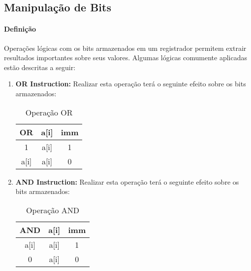 \documentclass{article}
\begin{document}
        \subsection{Manipulação de Bits}
            \paragraph{Definição}Operações lógicas com os bits armazenados em um registrador permitem extrair resultados importantes sobre seus valores. Algumas lógicas comumente aplicadas estão descritas a seguir:
                \begin{enumerate}[rightmargin = \leftmargin]
                    \item \textbf{OR Instruction:} Realizar esta operação terá o seguinte efeito sobre os bits armazenados:
                        \begin{table}[H]
                            \centering
                            \begin{tabular}[]{c|cc}\hline
                                OR   & a[i] & imm\\\hline
                                1    & a[i] & 1\\
                                a[i] & a[i] & 0\\\hline
                            \end{tabular}
                            \caption{Operação OR}
                        \end{table}\noindent

                    \item \textbf{AND Instruction:} Realizar esta operação terá o seguinte efeito sobre os bits armazenados:
                        \begin{table}[H]
                            \centering
                            \begin{tabular}[]{c|cc}\hline
                                AND  & a[i] & imm\\\hline
                                a[i] & a[i] & 1\\
                                0    & a[i] & 0\\\hline
                            \end{tabular}
                            \caption{Operação AND}
                        \end{table}\noindent


\end{enumerate}
\end{document}
